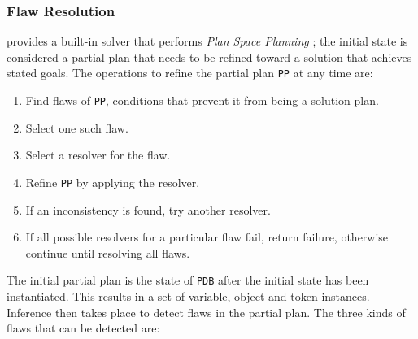 \subsubsection{Flaw Resolution}
\label{sec:europa:flaws}

\eu provides a built-in solver that performs \emph{Plan Space
  Planning} \cite{ghallab04}; the initial state is considered a
partial plan that needs to be refined toward a solution that achieves
stated goals. The operations to refine the partial plan \texttt{PP} at
any time are:

\begin{enumerate}

\item Find flaws of \texttt{PP}, \ie conditions that prevent it from
  being a solution plan.

\item Select one such flaw.

\item Select a resolver for the flaw.

\item Refine \texttt{PP} by applying the resolver.

\item If an inconsistency is found, try another resolver.

\item If all possible resolvers for a particular flaw fail, return
  failure, otherwise continue until resolving all flaws.

\end{enumerate}
	
The initial partial plan is the state of \eus \texttt{PDB} after the
initial state has been instantiated. This results in a set of
variable, object and token instances. Inference then takes place to
detect flaws in the partial plan. The three kinds of flaws that can be
detected are:

